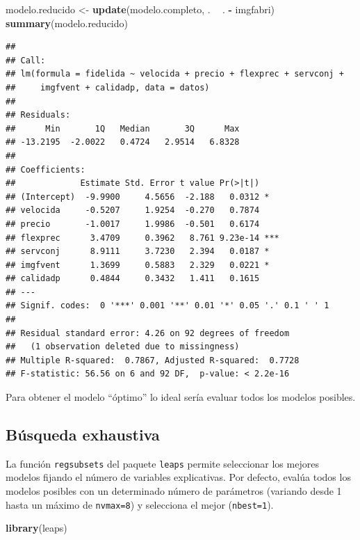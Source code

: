 \documentclass[]{book}
\newenvironment{Shaded}{\begin{snugshade}}{\end{snugshade}}
\newcommand{\KeywordTok}[1]{\textcolor[rgb]{0.13,0.29,0.53}{\textbf{#1}}}
\newcommand{\NormalTok}[1]{#1}
\newcommand{\OperatorTok}[1]{\textcolor[rgb]{0.81,0.36,0.00}{\textbf{#1}}}
\newcommand{\StringTok}[1]{\textcolor[rgb]{0.31,0.60,0.02}{#1}}
\begin{document}
\begin{Shaded}
\begin{Highlighting}[]
\NormalTok{modelo.reducido <-}\StringTok{ }\KeywordTok{update}\NormalTok{(modelo.completo, . }\OperatorTok{~}\StringTok{ }\NormalTok{. }\OperatorTok{-}\StringTok{ }\NormalTok{imgfabri)}
\KeywordTok{summary}\NormalTok{(modelo.reducido)}
\end{Highlighting}
\end{Shaded}

\begin{verbatim}
## 
## Call:
## lm(formula = fidelida ~ velocida + precio + flexprec + servconj + 
##     imgfvent + calidadp, data = datos)
## 
## Residuals:
##      Min       1Q   Median       3Q      Max 
## -13.2195  -2.0022   0.4724   2.9514   6.8328 
## 
## Coefficients:
##             Estimate Std. Error t value Pr(>|t|)    
## (Intercept)  -9.9900     4.5656  -2.188   0.0312 *  
## velocida     -0.5207     1.9254  -0.270   0.7874    
## precio       -1.0017     1.9986  -0.501   0.6174    
## flexprec      3.4709     0.3962   8.761 9.23e-14 ***
## servconj      8.9111     3.7230   2.394   0.0187 *  
## imgfvent      1.3699     0.5883   2.329   0.0221 *  
## calidadp      0.4844     0.3432   1.411   0.1615    
## ---
## Signif. codes:  0 '***' 0.001 '**' 0.01 '*' 0.05 '.' 0.1 ' ' 1
## 
## Residual standard error: 4.26 on 92 degrees of freedom
##   (1 observation deleted due to missingness)
## Multiple R-squared:  0.7867, Adjusted R-squared:  0.7728 
## F-statistic: 56.56 on 6 and 92 DF,  p-value: < 2.2e-16
\end{verbatim}

Para obtener el modelo ``óptimo'' lo ideal sería evaluar todos los modelos posibles.

\hypertarget{busqueda-exhaustiva}{%
\subsection{Búsqueda exhaustiva}\label{busqueda-exhaustiva}}

La función \texttt{regsubsets} del paquete \texttt{leaps} permite seleccionar los mejores modelos
fijando el número de variables explicativas.
Por defecto, evalúa todos los modelos posibles con un determinado número de
parámetros (variando desde 1 hasta un máximo de \texttt{nvmax=8})
y selecciona el mejor (\texttt{nbest=1}).

\begin{Shaded}
\begin{Highlighting}[]
\KeywordTok{library}\NormalTok{(leaps)}
\end{Highlighting}
\end{Shaded}
\end{document}
